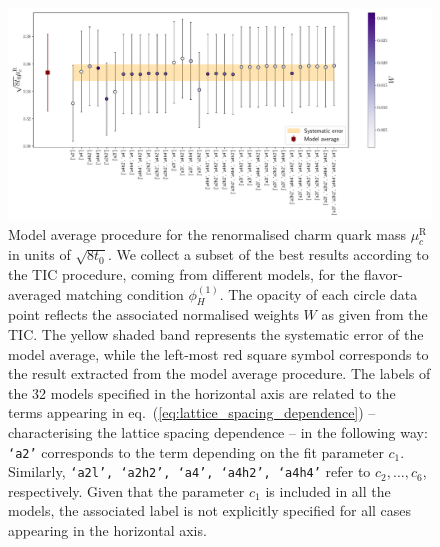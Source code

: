 \begin{figure}
	\centering
	\includegraphics[scale=0.32]{./cap6/figs/mc/cat_ave_tot_muc_fl_ave.pdf}
	\caption{Model average procedure for the renormalised charm quark mass $\mu_c^{\textrm{R}}$ in units of $\sqrt{8t_0}$. We collect a subset of the best results according to the TIC procedure, coming from different models, for the flavor-averaged  matching condition $\phi_H^{(1)}$.   The opacity of each circle data point reflects the associated normalised weights $W$ as given from the TIC. The yellow shaded band represents the systematic error of the model average, while the left-most red square symbol corresponds to the result extracted from the model average procedure. The labels of the 32 models specified in the horizontal axis are related to the terms appearing in eq.~(\ref{eq:lattice_spacing_dependence}) -- characterising the lattice spacing dependence -- in the following way: \texttt{`a2'} corresponds to the term depending on the fit parameter $c_1$. Similarly, \texttt{`a2l', `a2h2', `a4', `a4h2', `a4h4'} refer to $c_2,\dots, c_6$, respectively. Given that the parameter $c_1$ is included in all the models, the associated label is not explicitly specified for all cases appearing in the horizontal axis.}
	\label{fig:mc_model_av_summary}
\end{figure}

